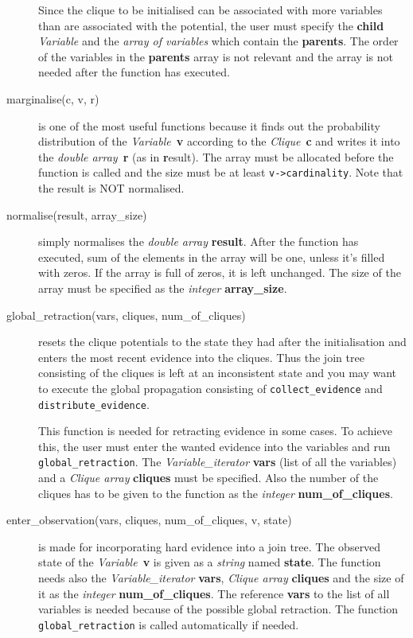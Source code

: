 \documentclass[12pt,a4paper]{report}
\newcommand{\cdatatype}[1]{{\it #1}}
\newcommand{\examplecode}[1]{\texttt{#1}}
\newcommand{\cparameter}[1]{\textbf{#1}}
\newcommand{\cfunction}[1]{\texttt{#1}}
\begin{document}
\begin{description}
Since the clique to be initialised can be associated with more
variables than are associated with the potential, the user must
specify the \cparameter{child} \cdatatype{Variable} and the 
\cdatatype{array of variables} which contain the
\cparameter{parents}. The order of the variables in the
\cparameter{parents} array is not relevant and the array is not needed 
after the function has executed.

\item[marginalise(c, v, r)] is one of the most useful functions
because it finds out the probability distribution of the 
\cdatatype{Variable}~\cparameter{v} according to the 
\cdatatype{Clique}~\cparameter{c} and writes it into the 
\cdatatype{double array}~\cparameter{r} (as in \textbf{r}esult). 
The array must be allocated before the function is called and the size 
must be at least \examplecode{v->cardinality}. Note that the result is 
NOT normalised.

\item[normalise(result, array\_size)] simply normalises the
\cdatatype{double array} \cparameter{result}. After the function has
executed, sum of the elements in the array will be one, unless it's 
filled with zeros. If the array is full of zeros, it is left
unchanged. The size of the array must be specified as the 
\cdatatype{integer} \cparameter{array\_size}.

\item[global\_retraction(vars, cliques, num\_of\_cliques)] resets the 
clique potentials to the state they had after the initialisation and 
enters the most recent evidence into the cliques. Thus the join tree
consisting of the cliques is left at an inconsistent state and you may
want to execute the global propagation consisting of 
\cfunction{collect\_evidence} and \cfunction{distribute\_evidence}. 

This function is needed for retracting evidence in some cases. To
achieve this, the user must enter the wanted evidence into the
variables and run \cfunction{global\_retraction}. The 
\cdatatype{Variable\_iterator} \cparameter{vars} (list of all the 
variables) and a \cdatatype{Clique array} \cparameter{cliques} must be 
specified. Also the number of the cliques has to be given to the 
function as the \cdatatype{integer} \cparameter{num\_of\_cliques}.

\item[enter\_observation(vars, cliques, num\_of\_cliques, v, state)] 
is made for incorporating hard evidence into a join tree. The observed
state of the \cdatatype{Variable}~\cparameter{v} is given as a 
\cdatatype{string} named \cparameter{state}. The function needs also 
the \cdatatype{Variable\_iterator} \cparameter{vars}, 
\cdatatype{Clique array} \cparameter{cliques} and the size of it
as the \cdatatype{integer} \cparameter{num\_of\_cliques}. The reference
\cparameter{vars} to the list of all variables is needed because of the
possible global retraction. The function \cfunction{global\_retraction}
is called automatically if needed.


\end{description}
\end{document}
